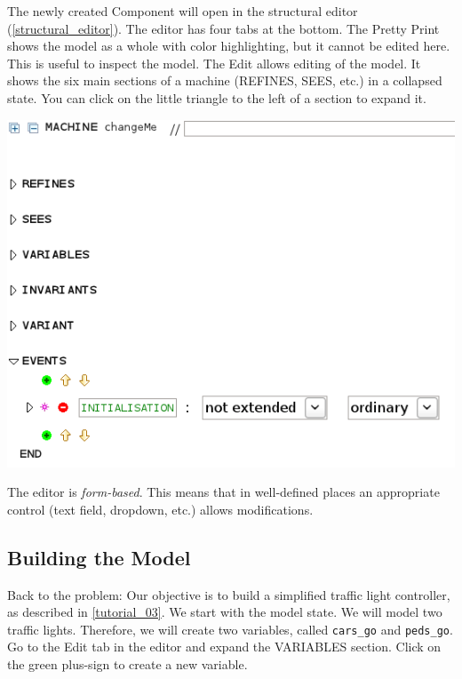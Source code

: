 The newly created Component will open in the structural editor (\ref{structural_editor}).  The editor has four tabs at the bottom.  The \textsf{Pretty Print} shows the model as a whole with color highlighting, but it cannot be edited here.  This is useful to inspect the model.  The \textsf{Edit} allows editing of the model.  It shows the six main sections of a machine (REFINES, SEES, etc.) in a collapsed state.  You can click on the little triangle to the left of a section to expand it.
\begin{center}
	\includegraphics[]{img/tutorial/interface.png}
\end{center}
The editor is \textit{form-based}.  This means that in well-defined places an appropriate control (text field, dropdown, etc.) allows modifications.



\subsection{Building the Model}

Back to the problem: Our objective is to build a simplified traffic light controller, as described in \ref{tutorial_03}.  We start with the model state.  We will model two traffic lights.  Therefore, we will create two variables, called \texttt{cars\_go} and \texttt{peds\_go}.  Go to the \textsf{Edit} tab in the editor and expand the \textsf{VARIABLES} section.  Click on the green plus-sign to create a new variable.

